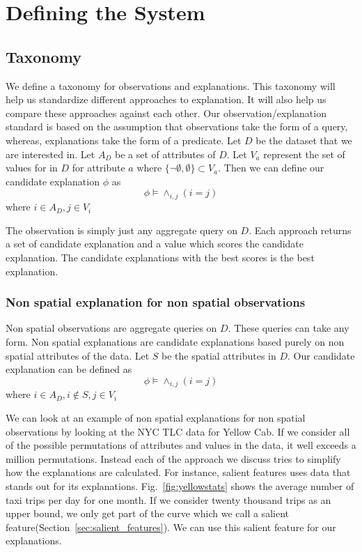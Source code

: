 \chapter{Defining the System}
\section{Taxonomy}
\label{sec:taxonomy}
We define a taxonomy for observations and explanations. This taxonomy will help us standardize different approaches to explanation. It will also help us compare these approaches against each other. Our observation/explanation standard is based on the assumption that observations take the form of a query, whereas, explanations take the form of a predicate. Let $D$ be the dataset that we are interested in. Let $A_D$ be a set of attributes of $D$. Let $V_a$ represent the set of values for in $D$ for attribute $a$ where $\{\neg \emptyset,\emptyset\} \subset V_a$. Then we can define our candidate explanation $\phi$ as $$\phi \models \wedge_{i,j} {(i=j)}$$ where $i \in A_D, j \in V_i $

The observation is simply just any aggregate query on $D$. Each approach returns a set of candidate explanation and a value which scores the candidate explanation. The candidate explanations with the best scores is the best explanation.

\subsection{Non spatial explanation for non spatial observations}
\label{sec:nonspatial_nonspatial}

Non spatial observations are aggregate queries on $D$. These queries can take any form. Non spatial explanations are candidate explanations based purely on non spatial attributes of the data. Let $S$ be the spatial attributes in $D$. Our candidate explanation can be defined as 
$$\phi \models \wedge_{i,j} {(i=j)}$$
where $i \in A_D, i \notin S, j \in V_i$

We can look at an example of non spatial explanations for non spatial observations by looking at the NYC TLC data for Yellow Cab. If we consider all of the possible permutations of attributes and values in the data, it well exceeds a million permutations. Instead each of the approach we discuss tries to simplify how the explanations are calculated. For instance, salient features uses data that stands out for its explanations. Fig.~\ref{fig:yellowstats} shows the average number of taxi trips per day for one month. If we consider twenty thousand trips as an upper bound, we only get part of the curve which we call a salient feature(Section~\ref{sec:salient_features}). We can use this salient feature for our explanations. 


